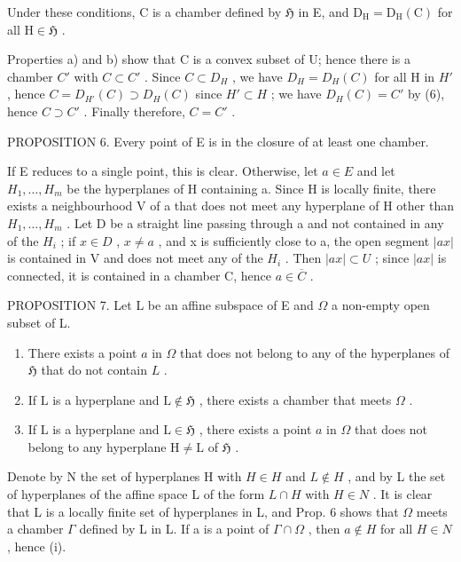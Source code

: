 Under these conditions, C is a chamber defined by \(\mathfrak{H}\) in E, and \(\mathrm{D_H} = \mathrm{D_H(C)}\) for all \(\mathrm{H} \in \mathfrak{H}\) .

Properties a) and b) show that C is a convex subset of U; hence there is a chamber \(C'\) with \(C \subset C'\) . Since \(C \subset D_{H}\) , we have \(D_{H} = D_{H}(C)\) for all H in \(H'\) , hence \(C = D_{H'}(C) \supset D_{H}(C)\) since \(H' \subset H\) ; we have \(D_{H}(C) = C'\) by (6), hence \(C \supset C'\) . Finally therefore, \(C = C'\) .

PROPOSITION 6. Every point of E is in the closure of at least one chamber.

If E reduces to a single point, this is clear. Otherwise, let \(a \in E\) and let \(H_{1}, \ldots, H_{m}\) be the hyperplanes of H containing a. Since H is locally finite, there exists a neighbourhood V of a that does not meet any hyperplane of H other than \(H_{1}, \ldots, H_{m}\) . Let D be a straight line passing through a and not contained in any of the \(H_{i}\) ; if \(x \in D\) , \(x \neq a\) , and x is sufficiently close to a, the open segment \(|ax|\) is contained in V and does not meet any of the \(H_{i}\) . Then \(|ax| \subset U\) ; since \(|ax|\) is connected, it is contained in a chamber C, hence \(a \in \overline{C}\) .

PROPOSITION 7. Let L be an affine subspace of E and \(\Omega\) a non-empty open subset of L.

\begin{enumerate}
\def\labelenumi{(\roman{enumi})}
\item
  There exists a point \(a\) in \(\Omega\) that does not belong to any of the hyperplanes of \(\mathfrak{H}\) that do not contain \(L\) .
\item
  If \(\mathrm{L}\) is a hyperplane and \(\mathrm{L} \notin \mathfrak{H}\) , there exists a chamber that meets \(\Omega\) .
\item
  If \(\mathrm{L}\) is a hyperplane and \(\mathrm{L} \in \mathfrak{H}\) , there exists a point \(a\) in \(\Omega\) that does not belong to any hyperplane \(\mathrm{H} \neq \mathrm{L}\) of \(\mathfrak{H}\) .
\end{enumerate}

Denote by N the set of hyperplanes H with \(H \in H\) and \(L \notin H\) , and by L the set of hyperplanes of the affine space L of the form \(L \cap H\) with \(H \in N\) . It is clear that L is a locally finite set of hyperplanes in L, and Prop. 6 shows that \(\Omega\) meets a chamber \(\Gamma\) defined by L in L. If a is a point of \(\Gamma \cap \Omega\) , then \(a \notin H\) for all \(H \in N\) , hence (i).

